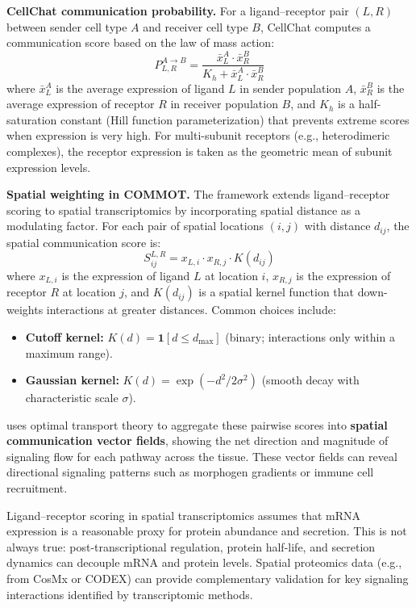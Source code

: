 \textbf{CellChat communication probability.} For a ligand--receptor pair
$(L, R)$ between sender cell type $A$ and receiver cell type $B$, CellChat
computes a communication score based on the law of mass action:
\begin{equation}
  \label{eq:spatial:cellchat_prob}
  P_{L,R}^{A \to B} = \frac{\bar{x}_L^A \cdot \bar{x}_R^B}
    {K_h + \bar{x}_L^A \cdot \bar{x}_R^B}
\end{equation}
where $\bar{x}_L^A$ is the average expression of ligand $L$ in sender
population $A$, $\bar{x}_R^B$ is the average expression of receptor $R$ in
receiver population $B$, and $K_h$ is a half-saturation constant (Hill function
parameterization) that prevents extreme scores when expression is very high.
For multi-subunit receptors (e.g., heterodimeric complexes), the receptor
expression is taken as the geometric mean of subunit expression levels.

\textbf{Spatial weighting in COMMOT.} The  framework extends
ligand--receptor scoring to spatial transcriptomics by incorporating spatial
distance as a modulating factor. For each pair of spatial locations $(i, j)$
with distance $d_{ij}$, the spatial communication score is:
\begin{equation}
  \label{eq:spatial:commot_score}
  S_{ij}^{L,R} = x_{L,i} \cdot x_{R,j} \cdot K(d_{ij})
\end{equation}
where $x_{L,i}$ is the expression of ligand $L$ at location $i$, $x_{R,j}$ is
the expression of receptor $R$ at location $j$, and $K(d_{ij})$ is a spatial
kernel function that down-weights interactions at greater distances. Common
choices include:
\begin{itemize}[nosep]
  \item \textbf{Cutoff kernel:} $K(d) = \mathbf{1}[d \leq d_{\max}]$ (binary;
    interactions only within a maximum range).
  \item \textbf{Gaussian kernel:} $K(d) = \exp(-d^2 / 2\sigma^2)$ (smooth
    decay with characteristic scale $\sigma$).
\end{itemize}

 uses optimal transport theory to aggregate these pairwise
scores into \textbf{spatial communication vector fields}, showing the net
direction and magnitude of signaling flow for each pathway across the tissue.
These vector fields can reveal directional signaling patterns such as morphogen
gradients or immune cell recruitment.

\begin{warningbox}
Ligand--receptor scoring in spatial transcriptomics assumes that mRNA expression
is a reasonable proxy for protein abundance and secretion. This is not always
true: post-transcriptional regulation, protein half-life, and secretion
dynamics can decouple mRNA and protein levels. Spatial proteomics data (e.g.,
from CosMx or CODEX) can provide complementary validation for key signaling
interactions identified by transcriptomic methods.
\end{warningbox}

